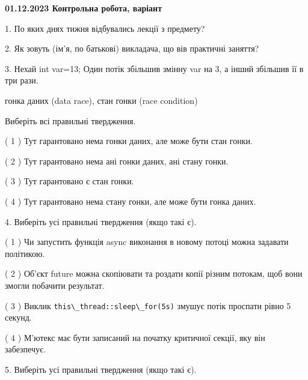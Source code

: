 \documentclass[12pt, ukrainian]{article}
\def\code#1{\Verb!#1!}
\begin{document}
\vspace{4mm}
\newpage
\begin {large}

\textbf{01.12.2023 Контрольна робота, варіант  }\par


{
1. По яких днях тижня відбувались лекції з предмету?



\vspace{5mm}
2. Як зовуть (ім'я, по батькові) викладача, що вів практичні заняття?



\vspace{5mm}
3. Нехай int var=13; Один потік збільшив змінну var на 3, а інший збільшив її в три рази.

гонка даних (data race), стан гонки (race condition)

Виберіть всі правильні твердження.\par
\vspace{2mm}
( 1 ) Тут гарантовано нема гонки даних, але може бути стан гонки.%

( 2 ) Тут гарантовано нема ані гонки даних, ані стану гонки.%

( 3 ) Тут гарантовано є стан гонки.%

( 4 ) Тут гарантовано нема стану гонки, але може бути гонка даних.%


\vspace{5mm}
4. Виберіть усі правильні твердження (якщо такі є).\par
\vspace{2mm}

( 1 ) Чи запустить функція  async виконання в новому потоці можна задавати політикою.%

( 2 ) Об’єкт future можна скопіювати та роздати копії різним потокам, щоб вони змогли побачити результат.%

( 3 ) Виклик \code{this\_thread::sleep\_for(5s)} змушує потік проспати рівно 5 секунд.%

( 4 ) М’ютекс має бути записаний на початку критичної секції, яку він забезпечує.%


\vspace{5mm}
5. Виберіть усі правильні твердження (якщо такі є).\par
\vspace{2mm}

}
\end{large}
\end{document}

